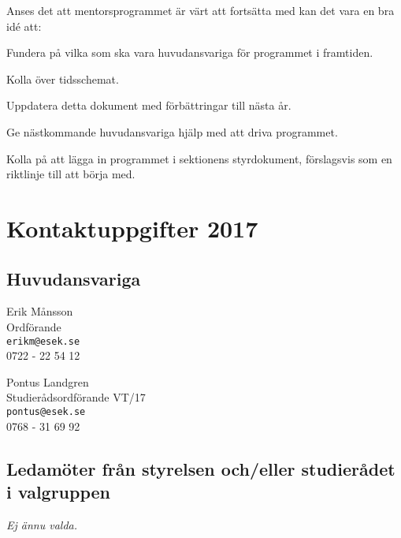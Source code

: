 \documentclass[10pt]{article}
\def\year{2017}
\begin{document}
    Anses det att mentorsprogrammet är värt att fortsätta med kan det vara en bra idé att:
    \begin{dashlist}
        \item Fundera på vilka som ska vara huvudansvariga för programmet i framtiden.
        \item Kolla över tidsschemat.
        \item Uppdatera detta dokument med förbättringar till nästa år.
        \item Ge nästkommande huvudansvariga hjälp med att driva programmet.
        \item Kolla på att lägga in programmet i sektionens styrdokument, förslagsvis som en riktlinje till att börja med.
    \end{dashlist}

    \section{Kontaktuppgifter \year}
    \subsection*{Huvudansvariga}
    Erik Månsson\\
    Ordförande\\
    \texttt{erikm@esek.se}\\
    0722 - 22 54 12

    Pontus Landgren\\
    Studierådsordförande VT/17\\
    \texttt{pontus@esek.se}\\
    0768 - 31 69 92

    \subsection*{Ledamöter från styrelsen och/eller studierådet i valgruppen}
    \emph{Ej ännu valda.}
\end{document}
